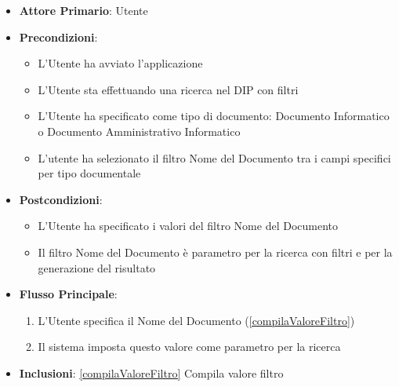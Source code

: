 \begin{itemize}
      \item \textbf{Attore Primario}: Utente
      \item \textbf{Precondizioni}: 
      \begin{itemize}
            \item L'Utente ha avviato l'applicazione
            \item L'Utente sta effettuando una ricerca nel DIP con filtri
            \item L'Utente ha specificato come tipo di documento: Documento Informatico o Documento Amministrativo Informatico
            \item L'utente ha selezionato il filtro Nome del Documento tra i campi specifici per tipo documentale
      \end{itemize}
      \item \textbf{Postcondizioni}: \begin{itemize}
            \item L'Utente ha specificato i valori del filtro Nome del Documento
            \item Il filtro Nome del Documento è parametro per la ricerca con filtri e per la generazione del risultato
      \end{itemize}
      \item \textbf{Flusso Principale}:
            \begin{enumerate}
                  \item L'Utente specifica il Nome del Documento (\ref{compilaValoreFiltro})
                  \item Il sistema imposta questo valore come parametro per la ricerca
            \end{enumerate}
      \item \textbf{Inclusioni}: \ref{compilaValoreFiltro} Compila valore filtro
\end{itemize}

